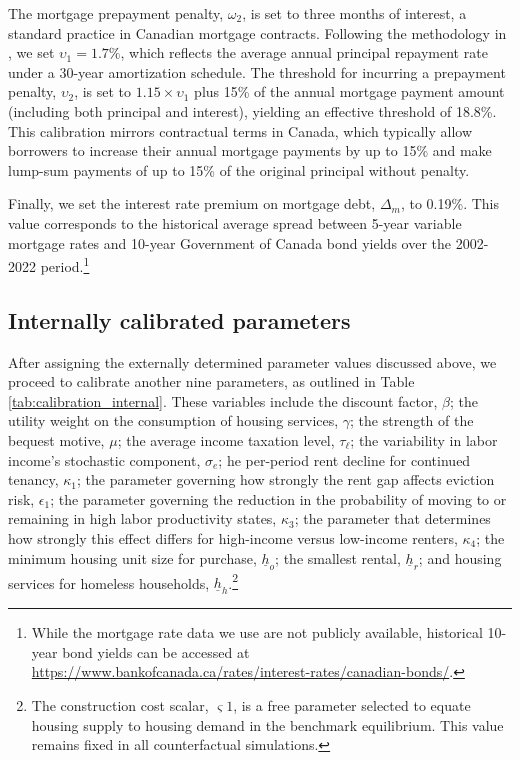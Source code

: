 \documentclass[parskip=full]{article}
\begin{document}
The mortgage prepayment penalty, $\omega_{2}$, is set to three months of interest, a standard practice in Canadian mortgage contracts. Following the methodology in \citet{kkk-2021}, we set $\upsilon_{1}=1.7\%$, which reflects the average annual principal repayment rate under a 30-year amortization schedule. The threshold for incurring a prepayment penalty, $\upsilon_{2}$, is set to $1.15 \times \upsilon_{1}$ plus 15\% of the annual mortgage payment amount (including both principal and interest), yielding an effective threshold of 18.8\%. This calibration mirrors contractual terms in Canada, which typically allow borrowers to increase their annual mortgage payments by up to 15\% and make lump-sum payments of up to 15\% of the original principal without penalty.

Finally, we set the interest rate premium on mortgage debt, $\Delta_{m}$, to 0.19\%. This value corresponds to the historical average spread between 5-year variable mortgage rates and 10-year Government of Canada bond yields over the 2002-2022 period.\footnote{While the mortgage rate data we use are not publicly available, historical 10-year bond yields can be accessed at \url{https://www.bankofcanada.ca/rates/interest-rates/canadian-bonds/}.}

\subsection{Internally calibrated parameters}

After assigning the externally determined parameter values discussed above, we proceed to calibrate another nine parameters, as outlined in Table \ref{tab:calibration_internal}. These variables include the discount factor, $\beta$; the utility weight on the consumption of housing services, $\gamma$; the strength of the bequest motive, $\mu$; the average income taxation level, $\tau_{\ell}$; the variability in labor income's stochastic component, $\sigma_{e}$; he per-period rent decline for continued tenancy, $\kappa_1$; the parameter governing how strongly the rent gap affects eviction risk, $\epsilon_1$; the parameter governing the reduction in the probability of moving to or remaining in high labor productivity states, $\kappa_3$; the parameter that determines how strongly this effect differs for high-income versus low-income renters, $\kappa_4$; the minimum housing unit size for purchase, $\underline{h}_{o}$; the smallest rental, $\underline{h}_{r}$; and housing services for homeless households, $\underline{h}_{h}$.\footnote{The construction cost scalar, $\varsigma{1}$, is a free parameter selected to equate housing supply to housing demand in the benchmark equilibrium. This value remains fixed in all counterfactual simulations.}
\end{document}
